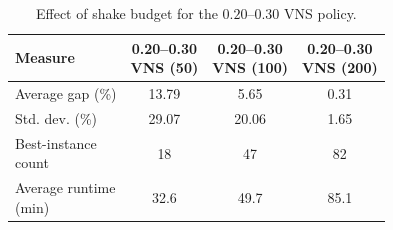 \documentclass[11pt]{article}
\begin{document}
\begin{table}[H]
\centering
\caption{Effect of shake budget for the \(0.20\)--\(0.30\) VNS policy.}
\label{tab:vns_budget_comparison}
\begin{tabular}{lccc}
\hline
\textbf{Measure}
& \shortstack{\textbf{0.20--0.30}\\\textbf{VNS (50)}}
& \shortstack{\textbf{0.20--0.30}\\\textbf{VNS (100)}}
& \shortstack{\textbf{0.20--0.30}\\\textbf{VNS (200)}} \\
\hline
Average gap (\%) & 13.79 & 5.65 & 0.31 \\
Std. dev. (\%) & 29.07 & 20.06 & 1.65 \\
\shortstack[l]{Best-instance\\count} & 18 & 47 & 82 \\
\shortstack[l]{Average runtime\\(min)} & 32.6 & 49.7 & 85.1 \\
\hline
\end{tabular}
\end{table}
\end{document}
